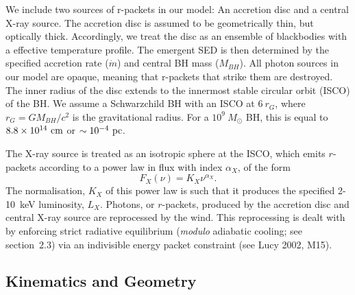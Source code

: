 \documentclass[useAMS,usenatbib]{mn2e_x}
\begin{document}
We include two sources of r-packets in our model:
An accretion disc and a central X-ray source.
The accretion disc is assumed to be geometrically thin, but optically thick.
Accordingly, we treat the disc as an ensemble of blackbodies with a 
\cite{shakurasunyaev1973} effective temperature profile. 
The emergent SED is then determined by the specified accretion rate ($\dot{m}$)
and central BH mass ($M_{BH}$).
All photon sources in our model are opaque, meaning
that r-packets that strike them are destroyed.
The inner radius of the disc extends to the innermost 
stable circular orbit (ISCO) of the BH. 
We assume a Schwarzchild BH with an ISCO at $6~r_G$, where 
$r_G = GM_{BH}/c^2$ is the gravitational radius.
For a $10^9~M_\odot$ BH, this is equal to $8.8\times10^{14}~{\rm cm}$ 
or $\sim10^{-4}~{\rm pc}$.  


The X-ray source is treated as an isotropic sphere at the ISCO,
which emits $r$-packets according to a power law in flux with index $\alpha_X$, of the form
\begin{equation}
F_X (\nu) = K_X \nu^{\alpha_X}.
\end{equation}
The normalisation, $K_X$ of this power law is such that it 
produces the specified 2-10~keV luminosity, $L_X$.
Photons, or $r$-packets, produced by the accretion disc and central X-ray source
are reprocessed by the wind. This reprocessing is dealt with by enforcing strict
radiative equilibrium ({\em modulo} adiabatic cooling; see section~2.3)
via an indivisible energy packet constraint (see Lucy 2002, M15).  

\subsection{Kinematics and Geometry}
\end{document}
